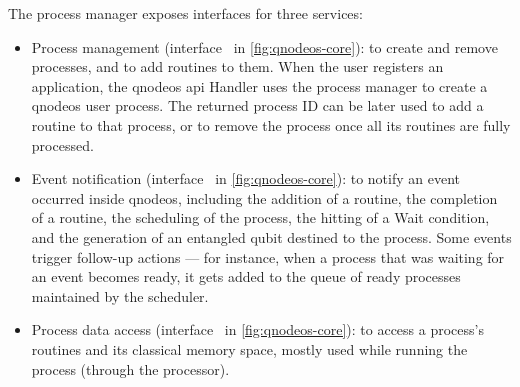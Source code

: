 The process manager exposes interfaces for three services:
\begin{itemize}
    \item Process management (interface~ in \cref{fig:qnodeos-core}): to create and
          remove processes, and to add routines to them. When the user registers an application, the
          \acrshort{qnodeos} \acrshort{api} Handler uses the process manager to create a
          \acrshort{qnodeos} user process. The returned process ID can be later used to add a
          routine to that process, or to remove the process once all its routines are fully
          processed.
    \item Event notification (interface~ in \cref{fig:qnodeos-core}): to notify an event
          occurred inside \acrshort{qnodeos}, including the addition of a routine, the completion of
          a routine, the scheduling of the process, the hitting of a Wait condition, and the
          generation of an entangled qubit destined to the process. Some events trigger follow-up
          actions --- for instance, when a process that was waiting for an event becomes ready, it
          gets added to the queue of ready processes maintained by the scheduler.
    \item Process data access (interface~ in \cref{fig:qnodeos-core}): to access a
          process's routines and its classical memory space, mostly used while running the process
          (through the processor).
\end{itemize}

